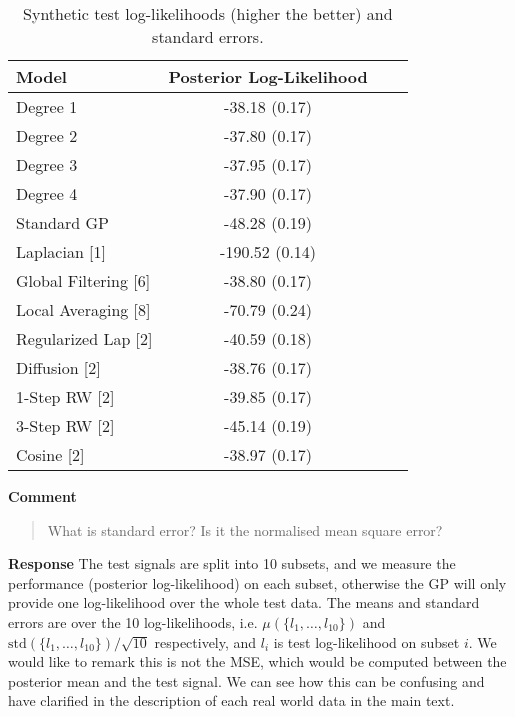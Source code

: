 \documentclass[11pt,onecolumn,journal]{IEEEtran}
\theoremstyle{definition}
\begin{document}
\begin{table}[h]
  \caption{Synthetic test log-likelihoods (higher the better) and standard errors.}\label{predictive_syn}
  \centering
  \tabcolsep=0.1cm
  \begin{tabular}{lccc}
    \hline
\textbf{Model} & \textbf{ Posterior Log-Likelihood }\\
\hline
Degree 1 & -38.18 (0.17) \\
Degree 2 & -37.80 (0.17) \\
Degree 3 & -37.95 (0.17) \\
Degree 4 & -37.90 (0.17) \\
\hline
Standard GP & -48.28 (0.19) \\
Laplacian [1] & -190.52 (0.14) \\
Global Filtering [6] & -38.80 (0.17) \\
Local Averaging [8] & -70.79 (0.24) \\

Regularized Lap [2] & -40.59 (0.18) \\

Diffusion [2] & -38.76 (0.17) \\

1-Step RW [2] & -39.85 (0.17) \\

3-Step RW [2] & -45.14 (0.19) \\

Cosine [2] & -38.97 (0.17) \\
    \hline
\end{tabular}%
\end{table}

\textbf{Comment}
\begin{quote}
What is standard error? Is it the normalised mean square error?
\end{quote}

\textbf{Response}
The test signals are split into 10 subsets, and we measure the performance (posterior log-likelihood) on each subset, otherwise the GP will only provide one log-likelihood over the whole test data. The means and standard errors are over the 10 log-likelihoods, i.e. $\mu(\{l_1, \dots, l_{10}\})$ and $\text{std}(\{l_1, \dots, l_{10}\})/\sqrt{10}$ respectively, and $l_i$ is test log-likelihood on subset $i$. We would like to remark this is not the MSE, which would be computed between the posterior mean and the test signal. We can see how this can be confusing and have clarified in the description of each real world data in the main text.
\end{document}
